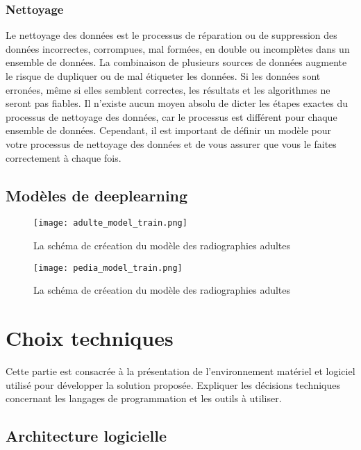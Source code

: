         \subsubsection{Nettoyage}
        Le nettoyage des données est le processus de réparation ou de suppression des données incorrectes, corrompues, mal formées, en double ou incomplètes dans un ensemble de données. La combinaison de plusieurs sources de données augmente le risque de dupliquer ou de mal étiqueter les données. Si les données sont erronées, même si elles semblent correctes, les résultats et les algorithmes ne seront pas fiables. Il n'existe aucun moyen absolu de dicter les étapes exactes du processus de nettoyage des données, car le processus est différent pour chaque ensemble de données. Cependant, il est important de définir un modèle pour votre processus de nettoyage des données et de vous assurer que vous le faites correctement à chaque fois.


   
    \subsection{Modèles de deeplearning}

    \begin{figure}[H]
        \centering
        \texttt{[image: adulte\_model\_train.png]}
        \caption{La schéma de créeation du modèle des radiographies adultes}\label{fig:adulte_model_schema}
    \end{figure}
    \begin{figure}[H]
        \centering
        \texttt{[image: pedia\_model\_train.png]}
        \caption{La schéma de créeation du modèle des radiographies adultes}\label{fig:pedia_model_schema}
    \end{figure}
\section{Choix techniques}
Cette partie est consacrée à la présentation de l'environnement matériel et logiciel utilisé pour développer la solution proposée. Expliquer les décisions techniques concernant les langages de programmation et les outils à utiliser.
    \subsection{Architecture logicielle}

